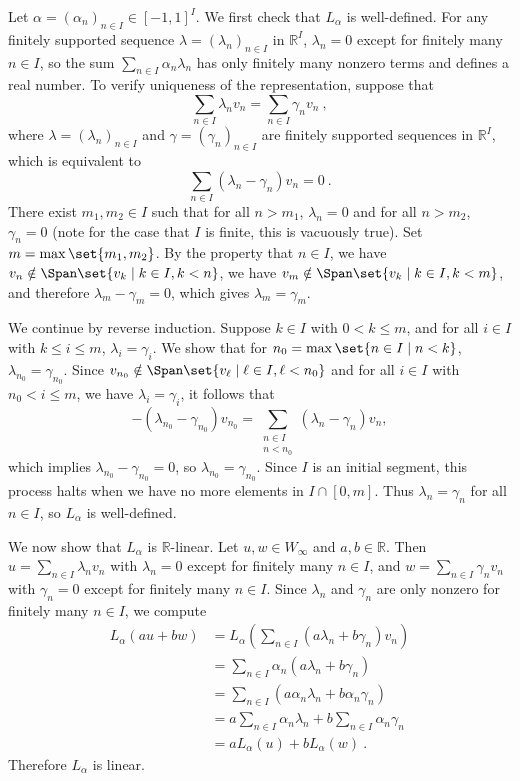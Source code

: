 \documentclass[10pt]{mypackage}
\begin{document}
\begin{solution}
Let $\alpha = \left(\alpha_n\right)_{n\in I} \in [-1,1]^I$. We first check that $L_\alpha$ is well-defined. For any finitely supported sequence $\lambda = \left(\lambda_n\right)_{n\in I}$ in $\mathbb{R}^I$, $\lambda_n = 0$ except for finitely many $n \in I$, so the sum $\sum_{n\in I}\alpha_n\lambda_n$ has only finitely many nonzero terms and defines a real number. To verify uniqueness of the representation, suppose that
\[
\sum_{n\in I}\lambda_n v_n = \sum_{n\in I}\gamma_n v_n \ ,
\]
where $\lambda = \left(\lambda_n\right)_{n\in I}$ and $\gamma = \left(\gamma_n\right)_{n\in I}$ are finitely supported sequences in $\mathbb{R}^I$, which is equivalent to  
\[
\sum_{n\in I}\left(\lambda_n - \gamma_n\right)v_n = 0 \ .
\]
There exist $m_1, m_2 \in I$ such that for all $n > m_1$, $\lambda_n = 0$ and for all $ n > m_2$, $\gamma_n = 0$ (note for the case that $I$ is finite, this is vacuously true). Set $m = \max\set{m_1, m_2}$. By the property that $ n \in I$, we have$ v_n \notin \Span\set{v_k \mid k \in I, k < n}$, we have $v_m \notin \Span\set{v_k \mid k \in I, k < m}$, and therefore $\lambda_m - \gamma_m = 0$, which gives $\lambda_m = \gamma_m$.

We continue by reverse induction. Suppose $k \in I$ with $0 < k \le m$, and for all $i \in I$ with $k \le i \le m$, $\lambda_i = \gamma_i$. We show that for $n_0 = \max\set{n \in I \mid n < k}$, $\lambda_{n_0} = \gamma_{n_0}$. Since $v_{n_0} \notin \Span\set{v_\ell \mid \ell \in I, \ell < n_0}$ and for all $ i \in I$ with $n_0 < i \le m$, we have $\lambda_i = \gamma_i$, it follows that
\[
-\left(\lambda_{n_0} - \gamma_{n_0}\right)v_{n_0} = \sum_{\substack{n\in I \\ n < n_0}} \left(\lambda_n - \gamma_n\right)v_n,
\]
which implies $\lambda_{n_0} - \gamma_{n_0} = 0$, so $\lambda_{n_0} = \gamma_{n_0}$. Since $I$ is an initial segment, this process halts when we have no more elements in $I \cap [0,m]$. Thus $\lambda_n = \gamma_n$ for all $n \in I$, so $L_\alpha$ is well-defined.

We now show that $L_\alpha$ is $\mathbb{R}$-linear. Let $u, w \in W_\infty$ and $a, b \in \mathbb{R}$. Then $u = \sum_{n\in I}\lambda_n v_n$ with $\lambda_n = 0$ except for finitely many $n \in I$, and $w = \sum_{n\in I}\gamma_n v_n$ with $\gamma_n = 0$ except for finitely many $n \in I$. Since $\lambda_n$ and $\gamma_n$ are only nonzero for finitely many $n \in I$, we compute
\begin{align*}
L_\alpha(au + bw) &= L_\alpha\left(\sum_{n\in I}(a\lambda_n + b\gamma_n)v_n\right) \\
&= \sum_{n\in I}\alpha_n(a\lambda_n + b\gamma_n) \\
&= \sum_{n\in I}\left(a\alpha_n\lambda_n + b\alpha_n\gamma_n\right) \\
&= a\sum_{n\in I}\alpha_n\lambda_n + b\sum_{n\in I}\alpha_n\gamma_n \\
&= aL_\alpha(u) + bL_\alpha(w) \ .
\end{align*}
Therefore $L_\alpha$ is linear.
\end{solution}
\end{document}
